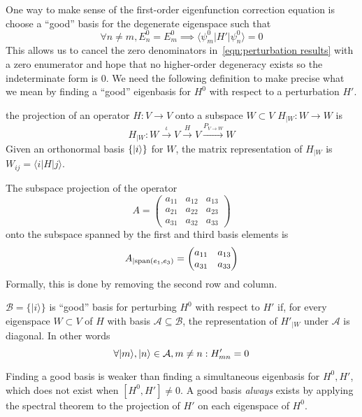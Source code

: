 One way to make sense of the first-order eigenfunction correction equation 
is choose a ``good'' basis for the degenerate eigenspace such that 
\[ 
    \forall n\neq m, E_n^0 = E_m^0 \implies \langle \psi_m^0 | H' | \psi_n^0 \rangle = 0
\] 
This allows us to cancel the zero denominators in~\ref{eqn:perturbation results} 
with a zero enumerator and hope that no higher-order degeneracy exists 
so the indeterminate form is $0$. We need the following definition to 
make precise what we mean by finding a ``good'' eigenbasis for $H^0$ with respect 
to a perturbation $H'$. 
\begin{definition}
    the projection of an operator \(H : V \to V\) onto a subspace 
    \(W \subset V\) \(H_{|W} : W \to W\) is 
    \[ 
        H_{|W} : W \xrightarrow \iota V \xrightarrow{H} V \xrightarrow{P_{V \to W}} W
    \] 
    Given an orthonormal basis $\{|i\rangle\}$ for $W$, 
    the matrix representation of \(H_{|W}\) 
    is \(W_{ij} = \langle i | H | j \rangle\). 
\end{definition}
\begin{example}
    The subspace projection of the operator 
    \[
        A = \begin{pmatrix}
            a_{11} & a_{12} & a_{13} \\ a_{21} & a_{22} & a_{23} \\ a_{31} & a_{32} & a_{33}
        \end{pmatrix}
    \] 
    onto the subspace spanned by the first and third basis elements is 
    \[ 
        A_{|\mathrm{span}(e_1, e_3)} = 
        \begin{pmatrix}
            a_{11} & a_{13} \\ a_{31} & a_{33}
        \end{pmatrix}
    \] 
    Formally, this is done by removing the second row and column. 
\end{example}
\begin{definition}
    \(\mathcal{B} = \{|i\rangle\}\) is ``good'' basis for perturbing 
    $H^0$ with respect to $H'$ if, for every eigenspace $W\subset V$ of $H$ 
    with basis $\mathcal A\subseteq \mathcal B$, the representation of $H'_{|W}$ 
    under $\mathcal A$ is diagonal. In other words 
    \[ 
        \forall |m\rangle, |n\rangle \in \mathcal A, m\neq n: H'_{mn} = 0
    \] 
\end{definition}
\begin{remark}
    Finding a good basis is weaker than finding a simultaneous eigenbasis for \(H^0, H'\), 
    which does not exist when \([H^0, H'] \neq 0\). 
    A good basis \textit{always} exists by applying the spectral theorem to 
    the projection of $H'$  on each eigenspace of $H^0$. 
\end{remark}
